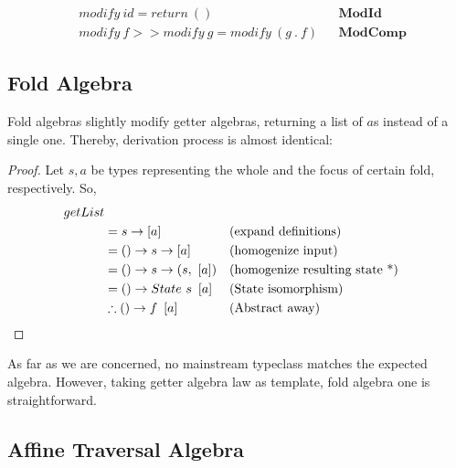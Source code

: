 \documentclass[a4paper]{article}
\begin{document}
\begin{align*}
  & modify\ id = return\ () &&\textbf{ModId} \\
  & modify\ f >> modify\ g = modify\ (g\ .\ f) &&\textbf{ModComp}
\end{align*}

\subsection{Fold Algebra}

Fold algebras slightly modify getter algebras, returning a list of $a$s instead
of a single one. Thereby, derivation process is almost identical:

\begin{proof}
  Let $s, a$ be types representing the whole and the focus of certain fold,
  respectively. So,
  \begin{align*}
    getList \\
    &= s \rightarrow \left[a\right] &&\text{(expand definitions)} \\
    &= () \rightarrow s \rightarrow \left[a\right] &&\text{(homogenize input)} \\
    &= () \rightarrow s \rightarrow (s,\ \left[a\right]) &&\text{(homogenize resulting state *)} \\
    &= () \rightarrow State\ s\ \left[a\right] &&\text{(State isomorphism)} \\
    &\therefore () \rightarrow f\ \left[a\right] &&\text{(Abstract away)}\qedhere
  \end{align*}
\end{proof}

As far as we are concerned, no mainstream typeclass matches the expected
algebra. However, taking getter algebra law as template, fold algebra one is
straightforward.

\subsection{Affine Traversal Algebra}
\end{document}

